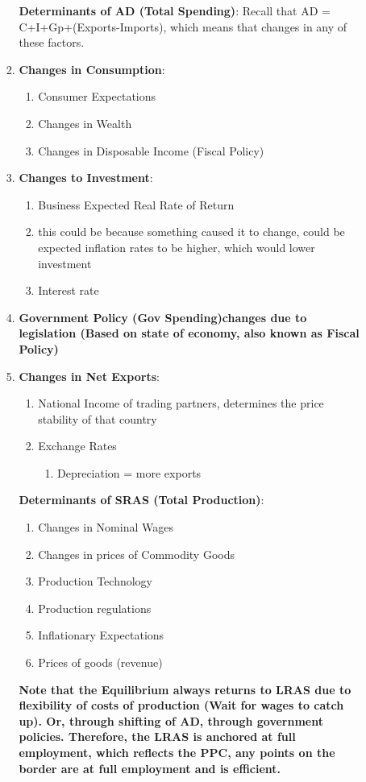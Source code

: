 \documentclass{article}
\begin{document}
\begin{enumerate}
\begin{enumerate}
\begin{enumerate}
\textbf{Determinants of AD (Total Spending)}:
Recall that AD = C+I+Gp+(Exports-Imports), which means that changes in any of these factors. 

    \item \textbf{Changes in Consumption}:
    \begin{enumerate}
        \item Consumer Expectations 
        \item Changes in Wealth
        \item Changes in Disposable Income (Fiscal Policy)
    \end{enumerate}
    \item \textbf{Changes to Investment}:
    \begin{enumerate}
        \item Business Expected Real Rate of Return
            \item this could be because something caused it to change, could be expected inflation rates to be higher, which would lower investment
        \item Interest rate
    \end{enumerate}
    \item \textbf{Government Policy (Gov Spending)changes due to legislation (Based on state of economy, also known as Fiscal Policy)}
    \item \textbf{Changes in Net Exports}:
    \begin{enumerate}
        \item National Income of trading partners, determines the price stability of that country
        \item Exchange Rates
        \begin{enumerate}
            \item Depreciation = more exports

        \end{enumerate}
    \end{enumerate}


\textbf{Determinants of SRAS (Total Production)}:
\begin{enumerate}
    \item Changes in Nominal Wages
    \item Changes in prices of Commodity Goods
    \item Production Technology
    \item Production regulations
    \item Inflationary Expectations
    \item Prices of goods (revenue)
\end{enumerate}
\textbf{Note that the Equilibrium always returns to LRAS due to flexibility of costs of production (Wait for wages to catch up). Or, through shifting of AD, through government policies. Therefore, the LRAS is anchored at full employment, which reflects the PPC, any points on the border are at full employment and is efficient.}













\end{enumerate}
\end{enumerate}
\end{enumerate}
\end{document}
